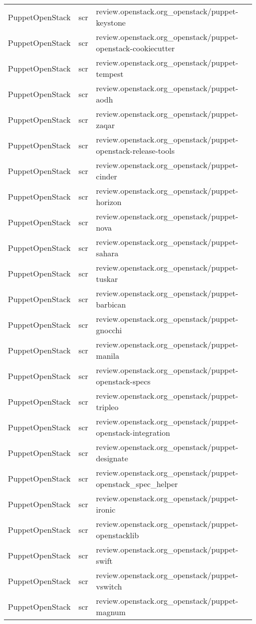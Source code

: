 \begin{center}
\begin{longtable}{|p{4cm}|p{1cm}|p{10cm}|}
PuppetOpenStack&scr&review.openstack.org\_openstack/puppet-keystone\\ 
PuppetOpenStack&scr&review.openstack.org\_openstack/puppet-openstack-cookiecutter\\ 
PuppetOpenStack&scr&review.openstack.org\_openstack/puppet-tempest\\ 
PuppetOpenStack&scr&review.openstack.org\_openstack/puppet-aodh\\ 
PuppetOpenStack&scr&review.openstack.org\_openstack/puppet-zaqar\\ 
PuppetOpenStack&scr&review.openstack.org\_openstack/puppet-openstack-release-tools\\ 
PuppetOpenStack&scr&review.openstack.org\_openstack/puppet-cinder\\ 
PuppetOpenStack&scr&review.openstack.org\_openstack/puppet-horizon\\ 
PuppetOpenStack&scr&review.openstack.org\_openstack/puppet-nova\\ 
PuppetOpenStack&scr&review.openstack.org\_openstack/puppet-sahara\\ 
PuppetOpenStack&scr&review.openstack.org\_openstack/puppet-tuskar\\ 
PuppetOpenStack&scr&review.openstack.org\_openstack/puppet-barbican\\ 
PuppetOpenStack&scr&review.openstack.org\_openstack/puppet-gnocchi\\ 
PuppetOpenStack&scr&review.openstack.org\_openstack/puppet-manila\\ 
PuppetOpenStack&scr&review.openstack.org\_openstack/puppet-openstack-specs\\ 
PuppetOpenStack&scr&review.openstack.org\_openstack/puppet-tripleo\\ 
PuppetOpenStack&scr&review.openstack.org\_openstack/puppet-openstack-integration\\ 
PuppetOpenStack&scr&review.openstack.org\_openstack/puppet-designate\\ 
PuppetOpenStack&scr&review.openstack.org\_openstack/puppet-openstack\_spec\_helper\\ 
PuppetOpenStack&scr&review.openstack.org\_openstack/puppet-ironic\\ 
PuppetOpenStack&scr&review.openstack.org\_openstack/puppet-openstacklib\\ 
PuppetOpenStack&scr&review.openstack.org\_openstack/puppet-swift\\ 
PuppetOpenStack&scr&review.openstack.org\_openstack/puppet-vswitch\\ 
PuppetOpenStack&scr&review.openstack.org\_openstack/puppet-magnum\\ 

\end{longtable}
\end{center}
